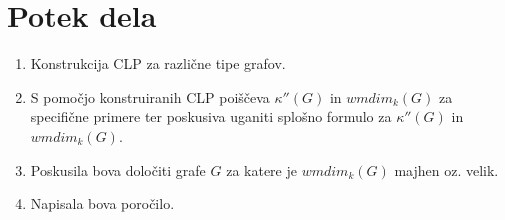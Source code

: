 \documentclass{article}
\theoremstyle{definition}
\begin{document}
\section{Potek dela}
\begin{enumerate}
    \item Konstrukcija CLP za različne tipe grafov.
    \item S pomočjo konstruiranih CLP poiščeva $\kappa''(G)$ in $wmdim_k(G)$ za specifične primere ter poskusiva uganiti splošno formulo za $\kappa''(G)$ in $wmdim_k(G)$.
    \item Poskusila bova določiti grafe $G$ za katere je $wmdim_k(G)$ majhen oz. velik.
    \item Napisala bova poročilo.
\end{enumerate}


\end{document}
